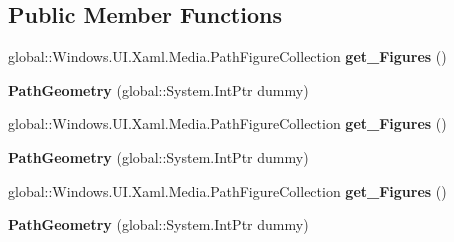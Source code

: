 \subsection*{Public Member Functions}
\begin{DoxyCompactItemize}
\item 
\mbox{\label{class_windows_1_1_u_i_1_1_xaml_1_1_media_1_1_path_geometry_a6a286f2ca23fa083907db4f00db6ce2a}} 
global\+::\+Windows.\+U\+I.\+Xaml.\+Media.\+Path\+Figure\+Collection {\bfseries get\+\_\+\+Figures} ()
\item 
\mbox{\label{class_windows_1_1_u_i_1_1_xaml_1_1_media_1_1_path_geometry_a434af4ed71396d646e1e5a69b9c2def7}} 
{\bfseries Path\+Geometry} (global\+::\+System.\+Int\+Ptr dummy)
\item 
\mbox{\label{class_windows_1_1_u_i_1_1_xaml_1_1_media_1_1_path_geometry_a6a286f2ca23fa083907db4f00db6ce2a}} 
global\+::\+Windows.\+U\+I.\+Xaml.\+Media.\+Path\+Figure\+Collection {\bfseries get\+\_\+\+Figures} ()
\item 
\mbox{\label{class_windows_1_1_u_i_1_1_xaml_1_1_media_1_1_path_geometry_a434af4ed71396d646e1e5a69b9c2def7}} 
{\bfseries Path\+Geometry} (global\+::\+System.\+Int\+Ptr dummy)
\item 
\mbox{\label{class_windows_1_1_u_i_1_1_xaml_1_1_media_1_1_path_geometry_a6a286f2ca23fa083907db4f00db6ce2a}} 
global\+::\+Windows.\+U\+I.\+Xaml.\+Media.\+Path\+Figure\+Collection {\bfseries get\+\_\+\+Figures} ()
\item 
\mbox{\label{class_windows_1_1_u_i_1_1_xaml_1_1_media_1_1_path_geometry_a434af4ed71396d646e1e5a69b9c2def7}} 
{\bfseries Path\+Geometry} (global\+::\+System.\+Int\+Ptr dummy)
\item 
\mbox{\label{class_windows_1_1_u_i_1_1_xaml_1_1_media_1_1_path_geometry_a6a286f2ca23fa083907db4f00db6ce2a}} 

\end{DoxyCompactItemize}
